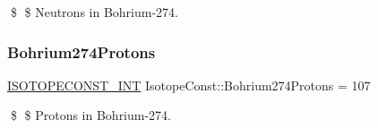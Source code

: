 \$ \$ Neutrons in Bohrium-\/274. \mbox{\label{group___isotope_const-_bohrium-_bh274_gaaf32b579bc87ea79107d012888f8ae32}} 
\subsubsection{\texorpdfstring{Bohrium274\+Protons}{Bohrium274Protons}}
{\footnotesize\ttfamily \mbox{\hyperlink{group___isotope_const-_macros_ga5f18360b3e99483a35c32d789e62621c}{I\+S\+O\+T\+O\+P\+E\+C\+O\+N\+S\+T\+\_\+\+I\+NT}} Isotope\+Const\+::\+Bohrium274\+Protons = 107}

\$ \$ Protons in Bohrium-\/274. 